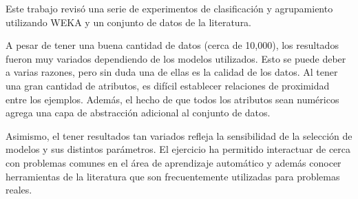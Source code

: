 \documentclass{llncs}
\begin{document}
Este trabajo revisó una serie de experimentos de clasificación y agrupamiento utilizando WEKA y un conjunto de datos de la literatura.

A pesar de tener una buena cantidad de datos (cerca de 10,000),
los resultados fueron muy variados dependiendo de los modelos utilizados.
Esto se puede deber a varias razones, pero sin duda una de ellas es la calidad de los datos.
Al tener una gran cantidad de atributos, es difícil establecer relaciones de proximidad entre los ejemplos.
Además, el hecho de que todos los atributos sean numéricos agrega una capa de abstracción adicional al conjunto de datos.

Asimismo, el tener resultados tan variados refleja la sensibilidad de la selección de modelos y sus distintos parámetros.
El ejercicio ha permitido interactuar de cerca con problemas comunes en el área de aprendizaje automático
y además conocer herramientas de la literatura que son frecuentemente utilizadas para problemas reales.



\end{document}
